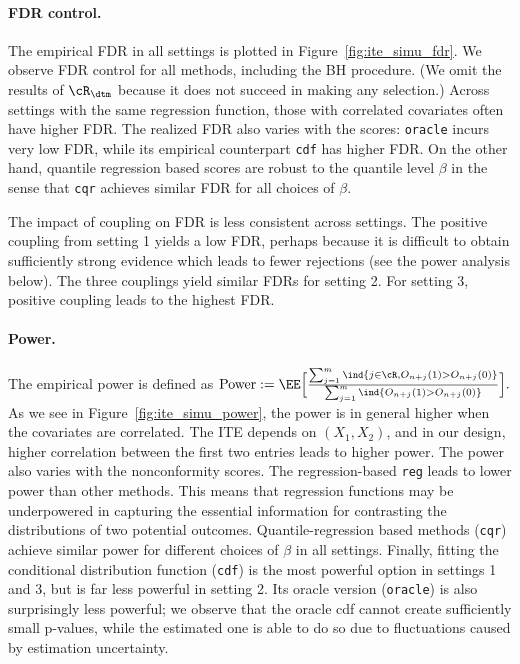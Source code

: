 \paragraph{FDR control.}
The empirical FDR in all settings is plotted in Figure~\ref{fig:ite_simu_fdr}.
We observe FDR control for all methods, including the BH procedure.
(We omit
the results of $\cR_{\dtm}$ because it does not succeed in making any selection.)
Across settings with the same regression function,
those with correlated covariates often have higher FDR.
The realized FDR also varies with the scores:
\texttt{oracle} incurs very low FDR,
while its empirical counterpart \texttt{cdf} has higher FDR.
On the other hand, quantile regression based scores are robust to the quantile level $\beta$ in the sense that \texttt{cqr} achieves similar FDR
for all choices of $\beta$.

The impact of coupling on FDR is less consistent across settings. The positive coupling from setting 1 yields a low FDR, perhaps because it is difficult to obtain sufficiently strong evidence
which leads to fewer rejections (see the power analysis below).
The three couplings yield similar FDRs for setting 2.
For setting 3, positive coupling leads to the highest FDR.




\paragraph{Power.} The empirical
power is defined as
$
\textrm{Power} :=
\EE\Big[\frac{\sum_{j=1}^m\ind\{j\in \cR,O_{n+j}(1)>O_{n+j}(0)\}}{\sum_{j=1}^m \ind\{O_{n+j}(1)>O_{n+j}(0)\}}\Big].
$
As we see in  Figure~\ref{fig:ite_simu_power},
the power is in general higher when the covariates are correlated.  The ITE depends on $(X_1,X_2)$, and in our design, higher correlation between
the first two entries leads to higher power.
The power also varies with the nonconformity scores.
The regression-based \texttt{reg} leads to lower power than
other methods. This means that regression functions may be underpowered
in capturing the essential information for contrasting
the distributions of two potential outcomes.
Quantile-regression based methods (\texttt{cqr}) achieve
similar power for different choices of $\beta$ in all settings.
Finally, fitting the conditional distribution function
(\texttt{cdf}) is the most powerful option in settings 1 and 3,
but is far less powerful in setting 2.
Its oracle version (\texttt{oracle}) is also surprisingly less powerful; we observe that the oracle cdf cannot create sufficiently small p-values, while
the estimated one is able to do so due to fluctuations caused by estimation uncertainty.

